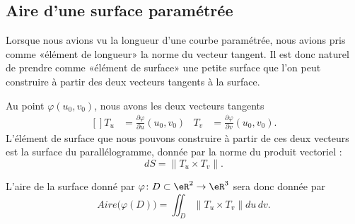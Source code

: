 \subsection{Aire d'une surface paramétrée}

Lorsque nous avions vu la longueur d'une courbe paramétrée, nous avions pris comme «élément de longueur» la norme du vecteur tangent. Il est donc naturel de prendre comme «élément de surface» une petite surface que l'on peut construire à partir des deux vecteurs tangents à la surface.

Au point \( \varphi(u_0,v_0)\), nous avons les deux vecteurs tangents
\begin{equation}
	\begin{aligned}[]
		T_u & =\frac{ \partial \varphi }{ \partial u }(u_0,v_0) & T_v & =\frac{ \partial \varphi }{ \partial v }(u_0,v_0).
	\end{aligned}
\end{equation}
L'élément de surface que nous pouvons construire à partir de ces deux vecteurs est la surface du parallélogramme, donnée par la norme du produit vectoriel :
\begin{equation}        \label{EQooNYWSooZuvcPe}
	dS=\| T_u\times T_v \|.
\end{equation}

L'aire de la surface donné par \( \varphi\colon D\subset\eR^2\to \eR^3\) sera donc donnée par
\begin{equation}
	Aire\big( \varphi(D) \big)=\iint_D\| T_u\times T_v \|du\,dv.
\end{equation}


